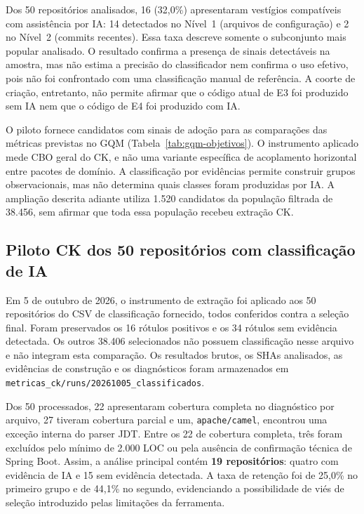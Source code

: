 Dos 50 repositórios analisados, 16 (32,0\%) apresentaram vestígios compatíveis com assistência por IA: 14 detectados no Nível~1 (arquivos de configuração) e 2 no Nível~2 (commits recentes). Essa taxa descreve somente o subconjunto mais popular analisado. O resultado confirma a presença de sinais detectáveis na amostra, mas não estima a precisão do classificador nem confirma o uso efetivo, pois não foi confrontado com uma classificação manual de referência. A coorte de criação, entretanto, não permite afirmar que o código atual de E3 foi produzido sem IA nem que o código de E4 foi produzido com IA.

O piloto fornece candidatos com sinais de adoção para as comparações das métricas previstas no GQM (Tabela~\ref{tab:gqm-objetivos}). O instrumento aplicado mede CBO geral do CK, e não uma variante específica de acoplamento horizontal entre pacotes de domínio. A classificação por evidências permite construir grupos observacionais, mas não determina quais classes foram produzidas por IA. A ampliação descrita adiante utiliza 1.520 candidatos da população filtrada de 38.456, sem afirmar que toda essa população recebeu extração CK.


\subsection{Piloto CK dos 50 repositórios com classificação de IA}
\label{subsec:res-ck-classificados}

Em 5 de outubro de 2026, o instrumento de extração foi aplicado aos 50 repositórios do CSV de classificação fornecido, todos conferidos contra a seleção final. Foram preservados os 16 rótulos positivos e os 34 rótulos sem evidência detectada. Os outros 38.406 selecionados não possuem classificação nesse arquivo e não integram esta comparação. Os resultados brutos, os SHAs analisados, as evidências de construção e os diagnósticos foram armazenados em \texttt{metricas\_ck/runs/20261005\_classificados}.

Dos 50 processados, 22 apresentaram cobertura completa no diagnóstico por arquivo, 27 tiveram cobertura parcial e um, \texttt{apache/camel}, encontrou uma exceção interna do parser JDT. Entre os 22 de cobertura completa, três foram excluídos pelo mínimo de 2.000 LOC ou pela ausência de confirmação técnica de Spring Boot. Assim, a análise principal contém \textbf{19 repositórios}: quatro com evidência de IA e 15 sem evidência detectada. A taxa de retenção foi de 25,0\% no primeiro grupo e de 44,1\% no segundo, evidenciando a possibilidade de viés de seleção introduzido pelas limitações da ferramenta.

